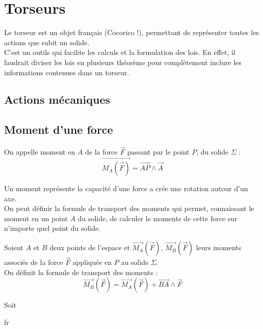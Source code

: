 \chapter{Torseurs}
Le torseur est un objet français (Cocorico !), permettant de représenter toutes les actions que subit un solide.\\
C'est un outils qui facilite les calculs et la formulation des lois.
En effet, il faudrait diviser les lois en plusieurs théorème pour complètement inclure les informations contenues dans un torseur.
\section{Actions mécaniques}
\section{Moment d'une force}
\begin{defi}
On appelle moment en $A$ de la force $\overrightarrow{F}$ passant par le point $P$, du solide $\Sigma$ :
$$\overrightarrow{M_{A}(\overrightarrow{F})}=\overrightarrow{AP}\land\overrightarrow{A}$$
\end{defi}
Un moment représente la capacité d'une force a crée une rotation autour d'un axe.\\
On peut définir la formule de transport des moments qui permet, connaissant le moment en un point $A$ du solide, de calculer le moments de cette force sur n'importe quel point du solide.
\begin{prop}
Soient $A$ et $B$ deux points de l'espace et $\overrightarrow{M_{A}}(\overrightarrow{F})$, $\overrightarrow{M_{B}}(\overrightarrow{F})$ leurs moments associés de la force $\overrightarrow{F}$ appliquée en $P$ au solide $\Sigma$.\\
On définit la formule de transport des moments :
$$\overrightarrow{M_{B}}(\overrightarrow{F})=\overrightarrow{M_{A}}(\overrightarrow{F})+\overrightarrow{BA}\land\overrightarrow{F}$$
\end{prop}
\begin{demo}
Soit
\end{demo}
\begin{meth}
fr

\end{meth}
